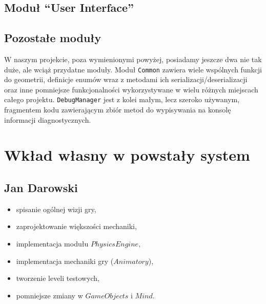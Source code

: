 \documentclass[licencjacka]{pracamgr}
\begin{document}
  \section{Moduł ``User Interface''}




  \section{Pozostałe moduły}
    W naszym projekcie, poza wymienionymi powyżej, posiadamy jeszcze dwa nie tak duże, ale wciąż przydatne moduły. Moduł
    \texttt{Common} zawiera wiele wspólnych funkcji do geometrii, definicje enumów wraz z metodami ich
    serializacji/deserializacji oraz inne pomniejsze funkcjonalności wykorzystywane w wielu różnych miejscach całego
    projektu. \texttt{DebugManager} jest z kolei małym, lecz szeroko używanym, fragmentem kodu zawierającym zbiór metod
    do wypisywania na konsolę informacji diagnostycznych.

    
\chapter{Wkład własny w powstały system}

  \section{Jan Darowski}
  \begin{itemize}
   \item spisanie ogólnej wizji gry,
   \item zaprojektowanie większości mechaniki,
   \item implementacja modułu $PhysicsEngine$,
   \item implementacja mechaniki gry ($Animatory$),
   \item tworzenie leveli testowych,
   \item pomniejsze zmiany w $GameObjects$ i $Mind$.
  \end{itemize}
\end{document}
